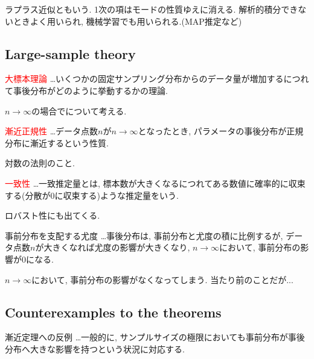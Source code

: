 \documentclass[11pt,a4pape,dvipdfmx]{jarticle}
\newcommand{\tcr}[1]{\textcolor{red}{#1}}
\begin{document}
ラプラス近似ともいう.
1次の項はモードの性質ゆえに消える.
解析的積分できないときよく用いられ, 機械学習でも用いられる.(MAP推定など)


\subsection{Large-sample theory}
\begin{itembox}[l]{\tcr{大標本理論}}
…いくつかの固定サンプリング分布からのデータ量が増加するにつれて事後分布がどのように挙動するかの理論.
\end{itembox}

$n\rightarrow\infty$の場合でについて考える.


\begin{itembox}[l]{\tcr{漸近正規性}}
…データ点数$n$が$n\rightarrow\infty$となったとき, パラメータの事後分布が正規分布に漸近するという性質.
\end{itembox}

対数の法則のこと.


\begin{itembox}[l]{\tcr{一致性}}
…一致推定量とは, 標本数が大きくなるにつれてある数値に確率的に収束する(分散が0に収束する)ような推定量をいう.
\end{itembox}

ロバスト性にも出てくる.


\begin{itembox}[l]{事前分布を支配する尤度}
…事後分布は, 事前分布と尤度の積に比例するが, データ点数$n$が大きくなれば尤度の影響が大きくなり, $n\rightarrow\infty$において, 事前分布の影響が0になる.
\end{itembox}


$n\rightarrow\infty$において, 事前分布の影響がなくなってしまう.
当たり前のことだが...



\subsection{Counterexamples to the theorems}
\begin{itembox}[l]{漸近定理への反例}
…一般的に, サンプルサイズの極限においても事前分布が事後分布へ大きな影響を持つという状況に対応する.
\end{itembox}
\end{document}

